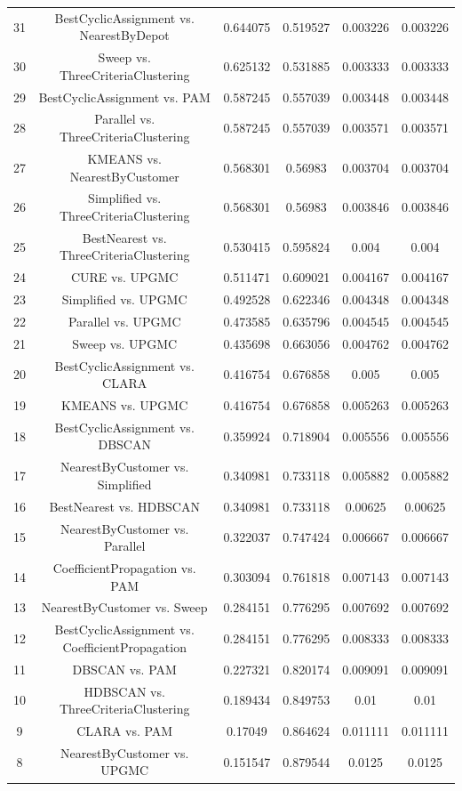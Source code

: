 \documentclass[a4paper,10pt]{article}
\begin{document}
\begin{landscape}
\begin{table}[!htp]
\begin{tabular}{cccccc}
31&BestCyclicAssignment vs. NearestByDepot&0.644075&0.519527&0.003226&0.003226\\
30&Sweep vs. ThreeCriteriaClustering&0.625132&0.531885&0.003333&0.003333\\
29&BestCyclicAssignment vs. PAM&0.587245&0.557039&0.003448&0.003448\\
28&Parallel vs. ThreeCriteriaClustering&0.587245&0.557039&0.003571&0.003571\\
27&KMEANS vs. NearestByCustomer&0.568301&0.56983&0.003704&0.003704\\
26&Simplified vs. ThreeCriteriaClustering&0.568301&0.56983&0.003846&0.003846\\
25&BestNearest vs. ThreeCriteriaClustering&0.530415&0.595824&0.004&0.004\\
24&CURE vs. UPGMC&0.511471&0.609021&0.004167&0.004167\\
23&Simplified vs. UPGMC&0.492528&0.622346&0.004348&0.004348\\
22&Parallel vs. UPGMC&0.473585&0.635796&0.004545&0.004545\\
21&Sweep vs. UPGMC&0.435698&0.663056&0.004762&0.004762\\
20&BestCyclicAssignment vs. CLARA&0.416754&0.676858&0.005&0.005\\
19&KMEANS vs. UPGMC&0.416754&0.676858&0.005263&0.005263\\
18&BestCyclicAssignment vs. DBSCAN&0.359924&0.718904&0.005556&0.005556\\
17&NearestByCustomer vs. Simplified&0.340981&0.733118&0.005882&0.005882\\
16&BestNearest vs. HDBSCAN&0.340981&0.733118&0.00625&0.00625\\
15&NearestByCustomer vs. Parallel&0.322037&0.747424&0.006667&0.006667\\
14&CoefficientPropagation vs. PAM&0.303094&0.761818&0.007143&0.007143\\
13&NearestByCustomer vs. Sweep&0.284151&0.776295&0.007692&0.007692\\
12&BestCyclicAssignment vs. CoefficientPropagation&0.284151&0.776295&0.008333&0.008333\\
11&DBSCAN vs. PAM&0.227321&0.820174&0.009091&0.009091\\
10&HDBSCAN vs. ThreeCriteriaClustering&0.189434&0.849753&0.01&0.01\\
9&CLARA vs. PAM&0.17049&0.864624&0.011111&0.011111\\
8&NearestByCustomer vs. UPGMC&0.151547&0.879544&0.0125&0.0125\\

\end{tabular}
\end{table}
\end{landscape}
\end{document}

